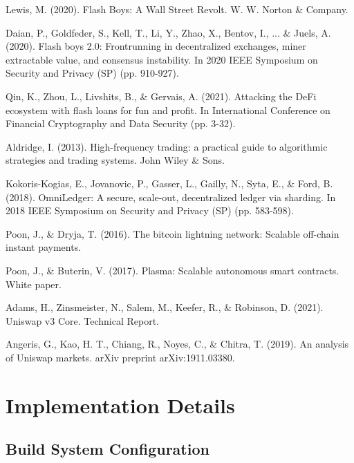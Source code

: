 \documentclass[12pt]{article}
\begin{document}

\begin{thebibliography}{9}

Lewis, M. (2020). Flash Boys: A Wall Street Revolt. W. W. Norton \& Company.

Daian, P., Goldfeder, S., Kell, T., Li, Y., Zhao, X., Bentov, I., ... \& Juels, A. (2020). Flash boys 2.0: Frontrunning in decentralized exchanges, miner extractable value, and consensus instability. In 2020 IEEE Symposium on Security and Privacy (SP) (pp. 910-927).

Qin, K., Zhou, L., Livshits, B., \& Gervais, A. (2021). Attacking the DeFi ecosystem with flash loans for fun and profit. In International Conference on Financial Cryptography and Data Security (pp. 3-32).

Aldridge, I. (2013). High-frequency trading: a practical guide to algorithmic strategies and trading systems. John Wiley \& Sons.

Kokoris-Kogias, E., Jovanovic, P., Gasser, L., Gailly, N., Syta, E., \& Ford, B. (2018). OmniLedger: A secure, scale-out, decentralized ledger via sharding. In 2018 IEEE Symposium on Security and Privacy (SP) (pp. 583-598).

Poon, J., \& Dryja, T. (2016). The bitcoin lightning network: Scalable off-chain instant payments.

Poon, J., \& Buterin, V. (2017). Plasma: Scalable autonomous smart contracts. White paper.

Adams, H., Zinsmeister, N., Salem, M., Keefer, R., \& Robinson, D. (2021). Uniswap v3 Core. Technical Report.

Angeris, G., Kao, H. T., Chiang, R., Noyes, C., \& Chitra, T. (2019). An analysis of Uniswap markets. arXiv preprint arXiv:1911.03380.

\end{thebibliography}

\appendix

\section{Implementation Details}

\subsection{Build System Configuration}
\end{document}
